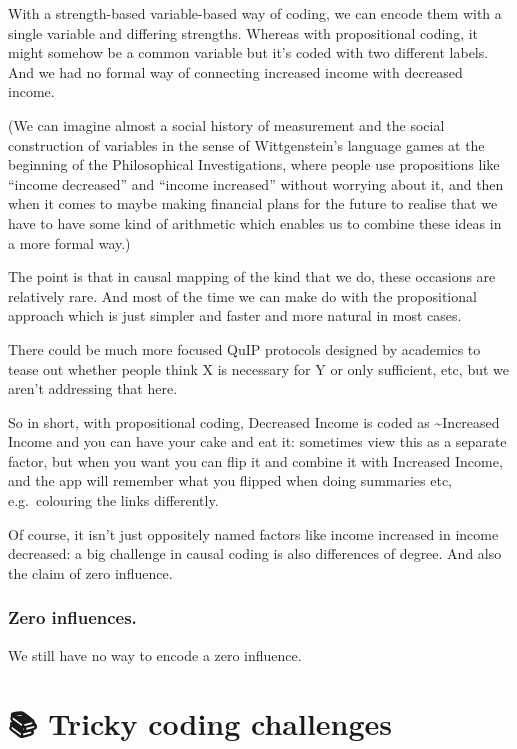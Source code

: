 \documentclass[
]{book}
\begin{document}
With a strength-based variable-based way of coding, we can encode them with a single variable and differing strengths.
Whereas with propositional coding, it might somehow be a common variable but it's coded with two different labels. And we had no formal way of connecting increased income with decreased income.

(We can imagine almost a social history of measurement and the social construction of variables in the sense of Wittgenstein's
language games at the beginning of the Philosophical Investigations, where people use propositions like ``income decreased'' and ``income increased'' without worrying about it, and then when it comes to maybe making financial plans for the future to realise that we have to have some kind of arithmetic which enables us to combine these ideas in a more formal way.)

The point is that in causal mapping of the kind that we do, these occasions are relatively rare. And most of the time we can make do with the propositional approach which is just simpler and faster and more natural in most cases.

There could be much more focused QuIP protocols designed by academics to tease out whether people think X is necessary for Y or only sufficient, etc, but we aren't addressing that here.

So in short, with propositional coding, Decreased Income is coded as \textasciitilde Increased Income and you can have your cake and eat it: sometimes view this as a separate factor, but when you want you can flip it and combine it with Increased Income, and the app will remember what you flipped when doing summaries etc, e.g.~colouring the links differently.

Of course, it isn't just oppositely named factors like income increased in income decreased: a big challenge in causal coding is also differences of degree. And also the claim of zero influence.

\hypertarget{zero-influences.}{%
\subsection{Zero influences.}\label{zero-influences.}}

We still have no way to encode a zero influence.

\hypertarget{tricky-coding-challenges}{%
\chapter{📚 Tricky coding challenges}\label{tricky-coding-challenges}}
\end{document}
